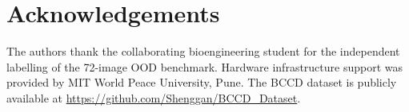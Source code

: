 \documentclass[10pt,conference]{IEEEtran}
\begin{document}
\section*{Acknowledgements}
The authors thank the collaborating bioengineering student for the independent labelling of the 72-image OOD benchmark. Hardware infrastructure support was provided by MIT World Peace University, Pune. The BCCD dataset is publicly available at \url{https://github.com/Shenggan/BCCD_Dataset}.



\end{document}
